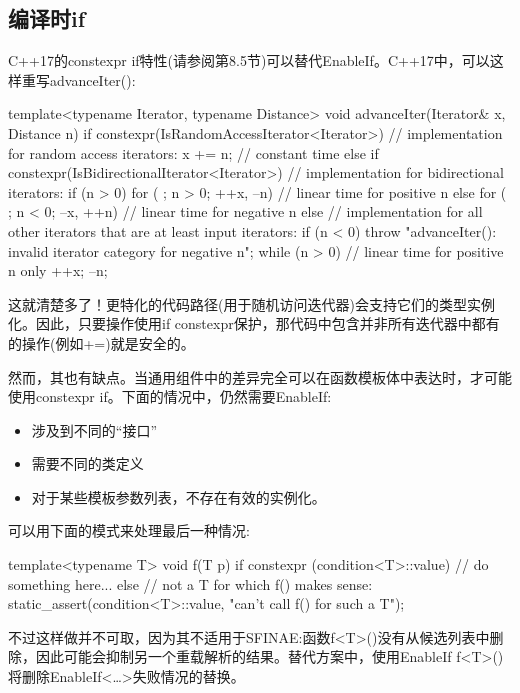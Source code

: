 \subsection{编译时if}

C++17的constexpr if特性(请参阅第8.5节)可以替代EnableIf。C++17中，可以这样重写advanceIter():

\begin{cpp}
template<typename Iterator, typename Distance>
void advanceIter(Iterator& x, Distance n) {
	if constexpr(IsRandomAccessIterator<Iterator>) {
		// implementation for random access iterators:
		x += n; // constant time
	}
	else if constexpr(IsBidirectionalIterator<Iterator>) {
		// implementation for bidirectional iterators:
		if (n > 0) {
			for ( ; n > 0; ++x, --n) { // linear time for positive n
			}
		} else {
			for ( ; n < 0; --x, ++n) { // linear time for negative n
			}
		}
	}
	else {
		// implementation for all other iterators that are at least input iterators:
		if (n < 0) {
			throw "advanceIter(): invalid iterator category for negative n";
		}
		while (n > 0) { // linear time for positive n only
			++x;
			--n;
		}
	}
}
\end{cpp}

这就清楚多了！更特化的代码路径(用于随机访问迭代器)会支持它们的类型实例化。因此，只要操作使用if constexpr保护，那代码中包含并非所有迭代器中都有的操作(例如+=)就是安全的。

然而，其也有缺点。当通用组件中的差异完全可以在函数模板体中表达时，才可能使用constexpr if。下面的情况中，仍然需要EnableIf:

\begin{itemize}
\item
涉及到不同的“接口”

\item
需要不同的类定义

\item
对于某些模板参数列表，不存在有效的实例化。
\end{itemize}

可以用下面的模式来处理最后一种情况:

\begin{cpp}
template<typename T>
void f(T p) {
	if constexpr (condition<T>::value) {
		// do something here...
	}
	else {
		// not a T for which f() makes sense:
		static_assert(condition<T>::value, "can’t call f() for such a T");
	}
}
\end{cpp}

不过这样做并不可取，因为其不适用于SFINAE:函数f<T>()没有从候选列表中删除，因此可能会抑制另一个重载解析的结果。替代方案中，使用EnableIf f<T>()将删除EnableIf<…>失败情况的替换。

